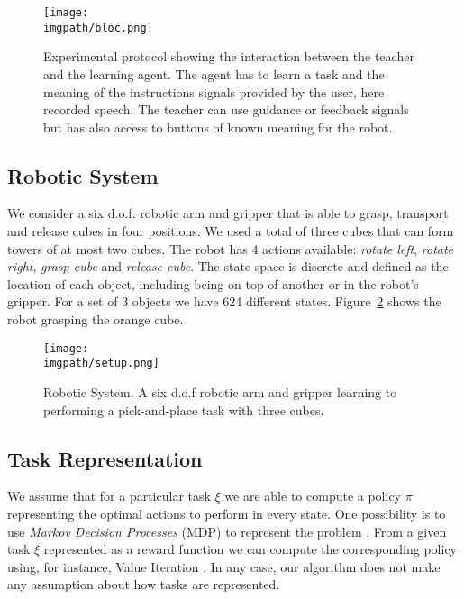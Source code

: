 \begin{figure}[!htbp]
  \centering
  \texttt{[image: \\imgpath/bloc.png]}
  \caption{Experimental protocol showing the interaction between the teacher and the learning agent. The agent has to learn a task and the meaning of the instructions signals provided by the user, here recorded speech. The teacher can use guidance or feedback signals but has also access to buttons of known meaning for the robot.}
  \label{fig:lfui:bloc}    
\end{figure}

\subsection{Robotic System}

We consider a six d.o.f. robotic arm and gripper that is able to grasp, transport and release cubes in four positions. We used a total of three cubes that can form towers of at most two cubes.  The robot has 4 actions available: \textit{rotate left}, \textit{rotate right}, \textit{grasp cube} and \textit{release cube}. The state space is discrete and defined as the location of each object, including being on top of another or in the robot's gripper. For a set of 3 objects we have 624 different states. Figure~\ref{fig:lfui:setup} shows the robot grasping the orange cube. 

\begin{figure}[!htbp]
  \centering
  \texttt{[image: \\imgpath/setup.png]}
  \caption{Robotic System. A six d.o.f robotic arm and gripper learning to performing a pick-and-place task with three cubes.}
  \label{fig:lfui:setup}
\end{figure}

\subsection{Task Representation}

We assume that for a particular task $\xi$ we are able to compute a policy $\pi$ representing the optimal actions to perform in every state. One possibility is to use \textit{Markov Decision Processes} (MDP) to represent the problem \cite{sutton1998reinforcement}. From a given task $\xi$ represented as a reward function we can compute the corresponding policy using, for instance, Value Iteration \cite{sutton1998reinforcement}. In any case, our algorithm does not make any assumption about how tasks are represented.

